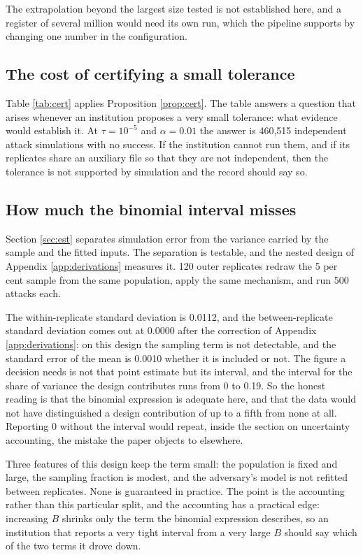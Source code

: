 \documentclass[11pt,a4paper]{article}
\theoremstyle{plain}
\theoremstyle{definition}
\begin{document}
The extrapolation beyond the largest size tested is not established here, and a
register of several million would need its own run, which the pipeline supports
by changing one number in the configuration.

\subsection{The cost of certifying a small tolerance}

Table \ref{tab:cert} applies Proposition \ref{prop:cert}. The table answers a
question that arises whenever an institution proposes a very small tolerance:
what evidence would establish it. At $\tau = 10^{-5}$ and $\alpha = 0.01$ the
answer is 460,515 independent attack simulations with no success. If the
institution cannot run them, and if its replicates share an auxiliary file so
that they are not independent, then the tolerance is not supported by
simulation and the record should say so.



\subsection{How much the binomial interval misses}\label{sec:nested}

Section \ref{sec:est} separates simulation error from the variance carried by the
sample and the fitted inputs. The separation is testable, and the nested design of
Appendix \ref{app:derivations} measures it. 120 outer replicates redraw the 5 per cent sample from the same population, apply
the same mechanism, and run 500 attacks each.

The within-replicate standard deviation is 0.0112, and the between-replicate
standard deviation comes out at 0.0000 after the correction of Appendix
\ref{app:derivations}: on this design the sampling term is not detectable, and the
standard error of the mean is 0.0010 whether it is included or not. The
figure a decision needs is not that point estimate but its interval, and the
interval for the share of variance the design contributes runs from 0 to 0.19. So
the honest reading is that the binomial expression is adequate here, and that the
data would not have distinguished a design contribution of up to a fifth from
none at all. Reporting 0 without the interval would repeat, inside the section on
uncertainty accounting, the mistake the paper objects to elsewhere.

Three features of this design keep the term small: the population is fixed and
large, the sampling fraction is modest, and the adversary's model is not refitted
between replicates. None is guaranteed in practice. The point is the accounting
rather than this particular split, and the accounting has a practical edge:
increasing $B$ shrinks only the term the binomial expression describes, so an
institution that reports a very tight interval from a very large $B$ should say
which of the two terms it drove down.
\end{document}
